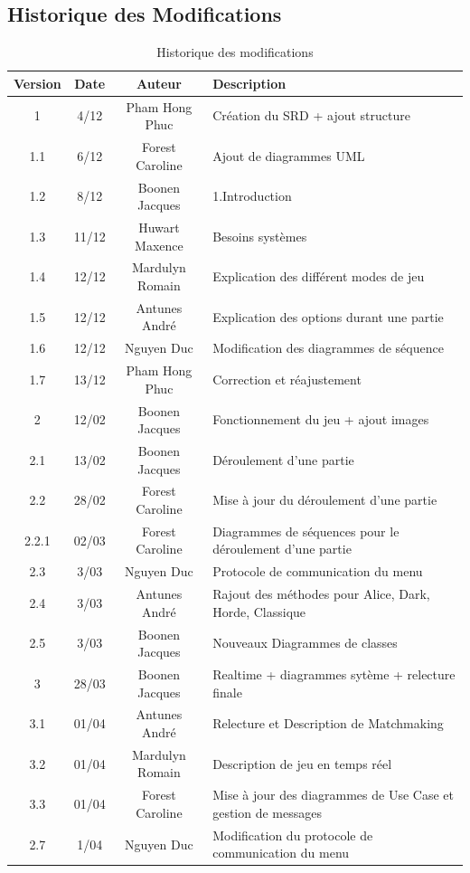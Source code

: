 \documentclass[10pt, a4paper]{article}
\begin{document}
		\subsection{Historique des Modifications}

		\begin{table}[h!]

			\centering

			\begin{tabular}{|c|c|c|p{50mm}|}
				\hline
				 \textbf{Version} & \textbf{Date} & \textbf{Auteur}  & \textbf{Description} \\ \hline
				 1 & 4/12 & Pham Hong Phuc & Création du SRD + ajout structure\\
				 1.1 & 6/12 & Forest Caroline & Ajout de diagrammes UML\\
				 1.2 & 8/12 & Boonen Jacques & 1.Introduction\\
				 1.3 & 11/12 & Huwart Maxence & Besoins systèmes\\
				 1.4 & 12/12 & Mardulyn Romain & Explication des différent modes de jeu\\
				 1.5 & 12/12 & Antunes André & Explication des options durant une partie\\
         1.6 & 12/12 & Nguyen Duc & Modification des diagrammes de séquence\\
         1.7 & 13/12 & Pham Hong Phuc & Correction et réajustement \\ \hline
				 2 & 12/02 & Boonen Jacques & Fonctionnement du jeu + ajout images \\
				 2.1 & 13/02 & Boonen Jacques & Déroulement d'une partie \\
				 2.2 & 28/02 & Forest Caroline & Mise à jour du déroulement d'une partie \\
				 2.2.1 & 02/03 & Forest Caroline & Diagrammes de séquences pour le déroulement d'une partie \\
				 2.3 & 3/03 & Nguyen Duc & Protocole de communication du menu \\
				 2.4 & 3/03 & Antunes André & Rajout des méthodes pour Alice, Dark, Horde, Classique \\
				 2.5 & 3/03 & Boonen Jacques & Nouveaux Diagrammes de classes \\ \hline
				 3 & 28/03 & Boonen Jacques & Realtime + diagrammes sytème + relecture finale \\
				 3.1 & 01/04 & Antunes André & Relecture et Description de Matchmaking\\
				 3.2 & 01/04 & Mardulyn Romain & Description de jeu en temps réel\\
				 3.3 & 01/04 & Forest Caroline & Mise à jour des diagrammes de Use Case et gestion de messages\\
				 2.7 & 1/04 & Nguyen Duc & Modification du protocole de communication du menu\\
				\hline
\end{tabular}
			\caption*{Historique des modifications}
			\end{table}
\clearpage
\end{document}

